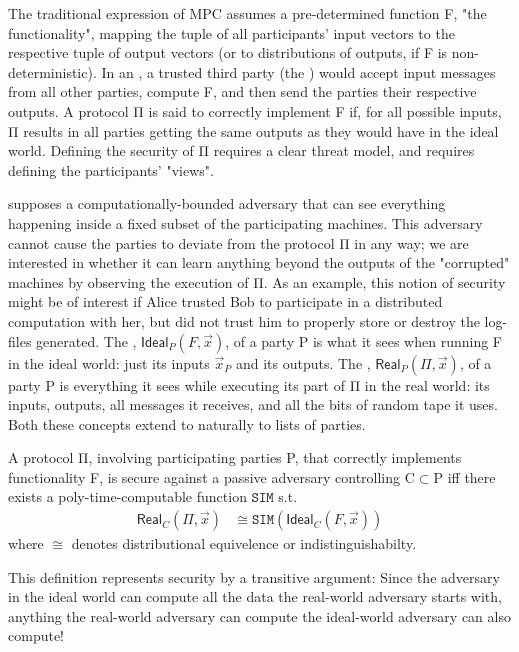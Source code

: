 \documentclass[conference]{IEEEtran}
\begin{document}
The traditional expression of MPC assumes a pre-determined function F, "the functionality",
mapping the tuple of all participants' input vectors to the respective tuple of output vectors
(or to distributions of outputs, if F is non-deterministic).
In an , a trusted third party (the ) would accept input messages
from all other parties, compute F, and then send the parties their respective outputs.
A  protocol Π is said to correctly implement F if, for all possible inputs,
Π results in all parties getting the same outputs as they would have in the ideal world.
Defining the security of Π requires a clear threat model, and requires defining the participants' "views".

 supposes a computationally-bounded adversary
that can see everything happening inside a fixed subset of the participating machines.
This adversary cannot cause the parties to deviate from the protocol Π in any way;
we are interested in whether it can learn anything beyond the outputs of the "corrupted" machines
by observing the execution of Π.
As an example, this notion of security might be of interest if Alice trusted Bob to participate
in a distributed computation with her, but did not trust him to properly store or destroy the log-files
generated.
The , $\mathsf{Ideal}_P(F,\vec{x})$, of a party P is what it sees when running F in the ideal world:
just its inputs $\vec{x}_P$ and its outputs.
The , $\mathsf{Real}_P(Π, \vec{x})$, of a party P is everything it sees while executing its part of Π in the real world:
its inputs, outputs, all messages it receives, and all the bits of random tape it uses.
Both these concepts extend to naturally to lists of parties.

\begin{definition}
    A protocol Π,
    involving participating parties P,
    that correctly implements functionality F,
    is secure against a passive adversary controlling C$\subset$P iff
    there exists a poly-time-computable function $\mathtt{SIM}$ s.t.
    $$\begin{aligned}
        \mathsf{Real}_C(Π, \vec{x}) &\cong \mathtt{SIM}(\mathsf{Ideal}_C(F,\vec{x}))
    \end{aligned}$$
    where $\cong$ denotes distributional equivelence or indistinguishabilty.
\end{definition}

This definition represents security by a transitive argument:
Since the adversary in the ideal world can compute all the data the real-world adversary starts with,
anything the real-world adversary can compute the ideal-world adversary can also compute!
\end{document}
